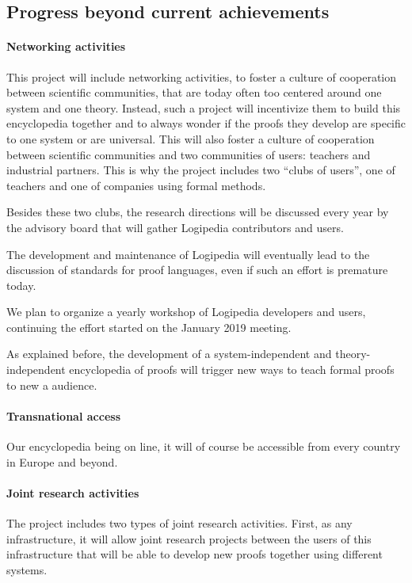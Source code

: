 \subsection{Progress beyond current achievements}


\paragraph{Networking activities}
This project will include networking activities, to foster a culture
of cooperation between scientific communities, that are today often
too centered around one system and one theory. Instead, such a project
will incentivize them to build this encyclopedia together and to always
wonder if the proofs they develop are specific to one system or are
universal. This will also foster a culture of cooperation between
scientific communities and two communities of users: teachers and
industrial partners. This is why the project includes two ``clubs of
users'', one of teachers and one of companies using formal methods.

Besides these two clubs, the research directions will be discussed every
year by the advisory board that will gather {\sc Logipedia} contributors
and users.

The development and maintenance of {\sc Logipedia} will eventually lead
to the discussion of standards for proof languages, even if such an
effort is premature today.

We plan to organize a yearly workshop of {\sc Logipedia} developers
and users, continuing the effort started on the January 2019 meeting.

As explained before, the development of a system-independent and
theory-independent encyclopedia of proofs will trigger new
ways to teach formal proofs to new a audience.


\paragraph{Transnational access}
Our encyclopedia being on line, it will of course be accessible from
every country in Europe and beyond.


\paragraph{Joint research activities}
The project includes two types of joint research activities.  First,
as any infrastructure, it will allow joint research projects
between the users of this infrastructure that will be able to develop
new proofs together using different systems.

